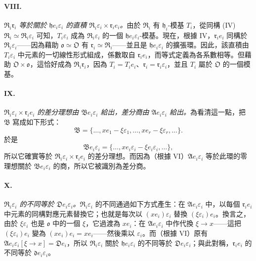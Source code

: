 \documentclass[11pt]{article}
\begin{document}
\paragraph{VIII.}
\emph{$\mathfrak R_i\mathfrak r_i$ 等於關於 $\mathfrak h e_i\varepsilon_i$ 的直積 $\mathfrak R_i\varepsilon_i\times\mathfrak r_i e_i$。}由於 $\mathfrak R_i$ 有 $\mathfrak h_i$-模基 $T_i$，從同構 (IV) $\mathfrak R_i\simeq\mathfrak R_i\varepsilon_i$ 可知，$T_i\varepsilon_i$ 成為 $\mathfrak R_i\varepsilon_i$ 的一個 $\mathfrak h e_i\varepsilon_i$-模基。現在，根據 IV，$\mathfrak r_i e_i$ 同構於 $\mathfrak R_i\varepsilon_i$——因為藉助 $\mathfrak o\simeq\mathfrak O$ 有 $\mathfrak r_i\simeq\mathfrak R_i$——並且是 $\mathfrak h e_i\varepsilon_i$ 的擴張環。因此，該直積由 $T_i\varepsilon_i$ 中元素的一切線性形式組成，係數取自 $\mathfrak r_i e_i$，而等式定義為各系數相等。但藉助 $\mathfrak O\times\mathfrak o$，這恰好成為 $\mathfrak R_i\mathfrak r_i$，因為 $T_i=T_i e_i$、$\mathfrak r_i=\mathfrak r_i\varepsilon_i$，並且 $T_i$ 屬於 $\mathfrak O$ 的一個模基。

\paragraph{IX.}
\emph{$\mathfrak R_i\varepsilon_i\times\mathfrak r_i e_i$ 的差分理想由 $\mathfrak B e_i\varepsilon_i$ 給出，差分商由 $\mathfrak A e_i\varepsilon_i$ 給出。}為看清這一點，把 $\mathfrak B$ 寫成如下形式：
\[
\mathfrak B=\{\ldots,xe_1-\xi\varepsilon_1,\ldots,xe_r-\xi\varepsilon_r,\ldots\}.
\]
於是
\[
\mathfrak B e_i\varepsilon_i
=\{\ldots,xe_i\varepsilon_i-\xi e_i\varepsilon_i,\ldots\},
\]
所以它確實等於 $\mathfrak R_i\varepsilon_i\times\mathfrak r_i e_i$ 的差分理想。而因為（根據 VI）$\mathfrak A e_i\varepsilon_i$ 等於此環的零理想關於 $\mathfrak B e_i\varepsilon_i$ 的商，所以它被識別為差分商。

\paragraph{X.}
\emph{$\mathfrak R_i\varepsilon_i$ 的不同等於 $\mathfrak D e_i\varepsilon_i$。}$\mathfrak R_i\varepsilon_i$ 的不同通過如下方式產生：在 $\mathfrak A e_i\varepsilon_i$ 中，以每個 $\mathfrak r_i e_i$ 中元素的同構對應元素替換它；也就是每次以 $(xe_i)\varepsilon_i$ 替換 $(\xi\varepsilon_i)e_i$。換言之，由於 $\xi\varepsilon_i$ 也是 $\mathfrak o$ 中的一個 $\xi$，它過渡為 $xe_i$：在 $\mathfrak A e_i\varepsilon_i$ 中作代換 $\xi\to x$——這把 $(\xi\varepsilon_i)e_i$ 變為 $(xe_i)e_i=xe_i$——然後乘以 $\varepsilon_i$。而（根據 VI）原有 $\mathfrak A e_i\varepsilon_i[\xi\to x]=\mathfrak D e_i$，所以 $\mathfrak R_i\varepsilon_i$ 關於 $\mathfrak h e_i\varepsilon_i$ 的不同等於 $\mathfrak D e_i\varepsilon_i$；與此對稱，$\mathfrak r_i e_i$ 的不同等於 $\mathfrak d e_i\varepsilon_i$。
\end{document}
